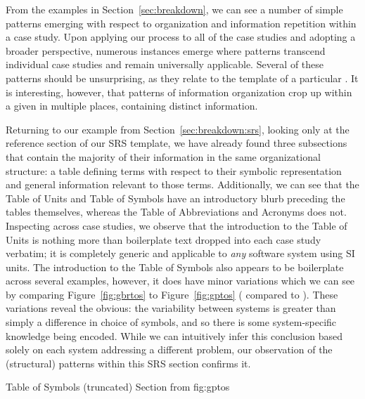 From the examples in Section~\ref{sec:breakdown}, we can see a number of simple 
patterns emerging with respect to organization and information repetition 
within a case study. Upon applying our process to all of the case studies and 
adopting a broader perspective, numerous instances emerge where patterns 
transcend individual case studies and remain universally applicable. Several of 
these patterns should be unsurprising, as they relate to the template of a 
particular \sf{}. It is interesting, however, that patterns of information 
organization crop up within a given \sf{} in multiple places, containing 
distinct information.

Returning to our example from Section~\ref{sec:breakdown:srs}, looking only at 
the reference section of our SRS template, we have already found three 
subsections that contain the majority of their information in the same 
organizational structure: a table defining terms with respect to their symbolic 
representation and general information relevant to those terms. Additionally, 
we can see that the Table of Units and Table of Symbols have an introductory 
blurb preceding the tables themselves, whereas the Table of Abbreviations and 
Acronyms does not. Inspecting across case studies, we observe that the 
introduction to the Table of Units is nothing more than boilerplate text 
dropped into each case study verbatim; it is completely generic and applicable 
to \emph{any} software system using SI units. The introduction to the Table of 
Symbols also appears to be boilerplate across several examples, however, it 
does have minor variations which we can see by comparing 
Figure~\ref{fig:gbrtos} to Figure~\ref{fig:gptos} (\gb{} compared to \gp{}). 
These variations reveal the obvious: the variability between systems is greater 
than simply a difference in choice of symbols, and so there is some 
system-specific knowledge being encoded. While we can intuitively infer this 
conclusion based solely on each system addressing a different problem, our 
observation of the (structural) patterns within this SRS section confirms it.

{Table of Symbols (truncated) Section from \gp{}}
{fig:gptos}

